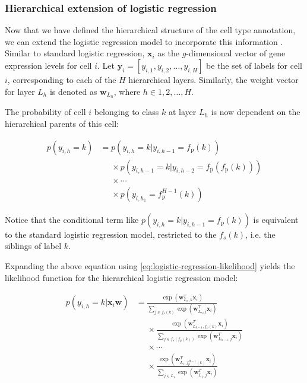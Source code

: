 \subsubsection*{Hierarchical extension of logistic regression}

Now that we have defined the hierarchical structure of the cell type annotation, we can extend the logistic regression model to incorporate this information . Similar to standard logistic regression, $\mathbf{x}_i$ as the $g$-dimensional vector of gene expression levels for cell $i$. Let $\mathbf{y}_i = [y_{i,1}, y_{i,2}, \ldots, y_{i,H}]$ be the set of labels for cell $i$, corresponding to each of the $H$ hierarchical layers. Similarly, the weight vector for layer $L_h$ is denoted as $\mathbf{w}_{L_h}$, where $h \in {1, 2, \ldots, H}$.

The probability of cell $i$ belonging to class $k$ at layer $L_h$ is now dependent on the hierarchical parents of this cell:

\begin{equation}
    \begin{aligned}
    p(y_{i,h} = k) &= p(y_{i,h} = k | y_{i,h-1} = f_{\text{p}}(k)) \\
    &\phantom{=} \times p(y_{i,h-1} = k | y_{i,h-2} = f_{\text{p}}(f_{\text{p}}(k))) \\
    &\phantom{=} \times \cdots \\
    &\phantom{=} \times p(y_{i,h_1} = f_{\text{p}}^{H-1}(k))
    \end{aligned}
\end{equation}

Notice that the conditional term like $p(y_{i,h} = k | y_{i,h-1} = f_{\text{p}}(k))$ is equivalent to the standard logistic regression model, restricted to the $f_s(k)$, i.e. the siblings of label $k$. 

Expanding the above equation using \cref{eq:logistic-regression-likelihood} yields the likelihood function for the hierarchical logistic regression model:

\begin{equation}
    \begin{aligned}
    p(y_{i,h} = k | \mathbf{x}_{i} \mathbf{w}) &= 
         \frac{\exp(\mathbf{w}_{L_h, k}^T \mathbf{x}_i)}{\sum_{j \in f_s(k)} \exp(\mathbf{w}_{L_h, j}^T \mathbf{x}_i)} \\
        &\phantom{=} \times \frac{\exp(\mathbf{w}_{L_{h-1}, f_p(k)}^T \mathbf{x}_i)}{\sum_{j \in  f_s(f_p(k))} \exp(\mathbf{w}_{L_{h-1}, j}^T \mathbf{x}_i)} \\
        &\phantom{=} \times \cdots \\
        &\phantom{=} \times \frac{\exp(\mathbf{w}_{L_1, f_p^{H-1}(k)}^T \mathbf{x}_i)}{\sum_{j \in L_1} \exp(\mathbf{w}_{L_1, j}^T \mathbf{x}_i)}
    \end{aligned}
\end{equation}

